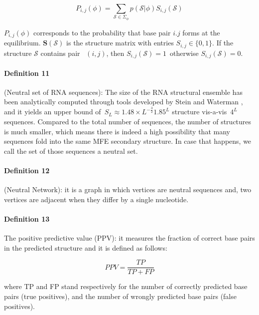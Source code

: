 \begin{equation}
	P_{i,j}(\phi) = \sum_{\mathcal{S} \in \Sigma_{\phi}}{p(\mathcal{S}|\phi)S_{i,j}(\mathcal{S})}
\end{equation} 

$P_{i,j}(\phi)$ corresponds to the probability that base pair $i.j$ forms at the equilibrium. 
\(\mathbf{S}(\mathcal{S})\) is the structure matrix with entries \(S_{i,j} \in  \{ 0, 1\}\). If the structure \(\mathcal{S}\) contains pair~ $(i ,j)$, then \(S_{i,j}(\mathcal{S}) = 1\)~otherwise \(S_{i,j}(\mathcal{S}) = 0\).

\paragraph{\textbf{Definition 11}} (Neutral set of RNA sequences): 
The size of the RNA structural ensemble has been analytically computed through tools developed by Stein and Waterman \cite{stein1979some}, and it yields an upper bound of~\(S_L\approx1.48\times L^{-\frac{3}{2}}1.85^L\) structure vis-a-vis~\(4^L\) sequences.
Compared to the total number of sequences, the number of structures is much smaller, which means there is indeed a high possibility that many sequences fold into the same MFE secondary structure. In case that happens, we call the set of those sequences a neutral set. 

\paragraph{\textbf{Definition 12}} (Neutral Network): it is a graph in which vertices are neutral sequences and, two vertices are adjacent when they differ by a single nucleotide.
\paragraph{\textbf{Definition 13}}  The positive predictive value (PPV):  it measures the fraction of correct base pairs in the predicted structure and it is defined as follows: 

\begin{equation}
	PPV = \frac{TP}{TP + FP}
\end{equation}

where TP and FP stand respectively for the number of correctly predicted base pairs (true positives), and the number of wrongly predicted base pairs (false positives). 

